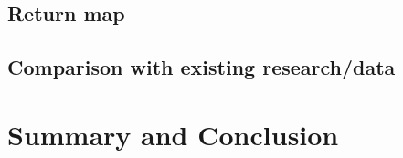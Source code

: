 \documentclass[twocolumn,secnumarabic,amssymb, nobibnotes, aps, prd]{revtex4-2}
\begin{document}
    
    \subsection{Return map}

    \subsection{Comparison with existing research/data}

\section{Summary and Conclusion}


\end{document}
